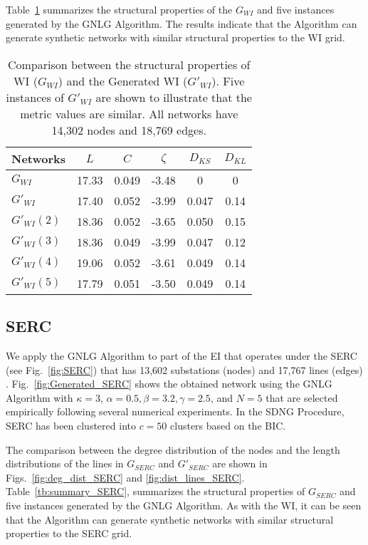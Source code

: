\documentclass[10pt,journal]{IEEEtran}
\begin{document}
 Table~\ref{tb:summary_WI} summarizes the structural properties of the $G_{WI}$ and five instances generated by the GNLG Algorithm. The results indicate that the Algorithm can generate synthetic networks with similar structural properties to the WI grid.


\begin{table}[t]
\centering
\vspace*{-.1cm}
\caption{Comparison between the structural properties of WI ($G_{WI}$) and the Generated WI ($G'_{WI}$). Five instances of $G'_{WI}$ are shown to illustrate that the metric values are similar. All networks have 14,302 nodes and 18,769 edges.}
\vspace*{-0.2cm}
\footnotesize
\begin{tabular}{|l|c|c|c|c|c|}
\hline
Networks& $L$&$C$& $\zeta$  & $D_{KS}$& $D_{KL}$\\
\hline
$G_{WI}$ & 17.33 &0.049 & -3.48 & 0&0\\
\hline
$G'_{WI}$ & 17.40 & 0.052 & -3.99 &0.047& 0.14\\
\hline
$G'_{WI} (2)$ & 18.36 & 0.052 & -3.65 &0.050& 0.15\\
\hline
$G'_{WI} (3)$ & 18.36 & 0.049 & -3.99 &0.047& 0.12\\
\hline
$G'_{WI} (4)$ & 19.06 & 0.052 & -3.61 &0.049& 0.14\\
\hline
$G'_{WI} (5)$ & 17.79 & 0.051 & -3.50&0.049 & 0.14\\
\hline
\end{tabular}
\label{tb:summary_WI}
\end{table}
\normalsize


 \subsection{SERC}
We apply the GNLG Algorithm to part of the EI that operates under the SERC (see Fig.~\ref{fig:SERC}) that has 13,602 substations (nodes) and 17,767 lines (edges) . Fig.~\ref{fig:Generated_SERC} shows the obtained network using the GNLG Algorithm with $\kappa=3$, $\alpha = 0.5, \beta = 3.2, \gamma = 2.5$,  and $N=5$ that are selected empirically  following several numerical experiments. In the SDNG Procedure, SERC has been clustered into $c=50$ clusters based on the BIC. 

The comparison between the degree distribution of the nodes and the length distributions of the lines in $G_{SERC}$ and $G'_{SERC}$ are shown in Figs.~\ref{fig:deg_dist_SERC} and \ref{fig:dist_lines_SERC}. Table~\ref{tb:summary_SERC}, summarizes the structural properties of $G_{SERC}$ and five instances generated by the GNLG Algorithm. As with the WI, it can be seen that the Algorithm can generate synthetic networks with similar structural properties to the SERC grid.
\end{document}
